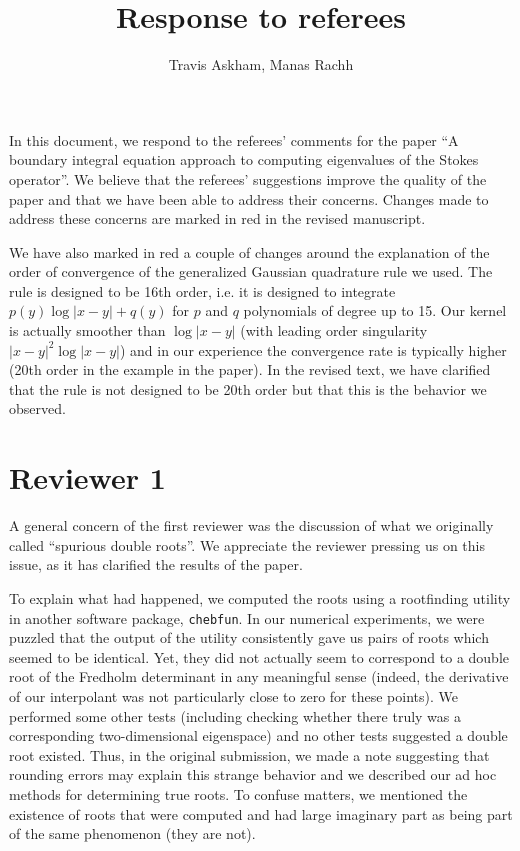 \documentclass{article}
\title{Response to referees}
\author{Travis Askham, Manas Rachh}
\begin{document}
\maketitle

In this document, we respond to the referees' comments
for the paper ``A boundary integral equation approach to computing
eigenvalues of the Stokes operator''.
We believe that the referees' suggestions improve the
quality of the paper and that we have been able to
address their concerns. Changes made to address these concerns
are marked in {\color{red} red} in the revised manuscript.

We have also marked in {\color{red} red} a couple of
changes around the explanation of the order of convergence
of the generalized Gaussian quadrature rule we used.
The rule is designed to be 16th order, i.e. it is designed
to integrate $p(y)\log|x-y| + q(y)$ for $p$ and
$q$ polynomials of degree up to 15. Our kernel is actually
smoother than $\log|x-y|$ (with leading order
singularity $|x-y|^2\log|x-y|$) and in our experience the
convergence rate is typically higher (20th order in
the example in the paper). In the revised text, we have clarified
that the rule is not designed to be 20th order but that this is
the behavior we observed. 


\section{Reviewer 1}

A general concern of the first reviewer was the discussion
of what we originally called ``spurious double roots''.
We appreciate the reviewer pressing us on this issue, as it
has clarified the results of the paper.

To explain what had happened, we computed the roots using a rootfinding
utility in another software package, \texttt{chebfun}. In our
numerical experiments, we were puzzled that the output of the
utility consistently gave us pairs of roots which seemed to
be identical. Yet, they did not actually seem to correspond to
a double root of the Fredholm determinant in any meaningful sense
(indeed, the derivative of our interpolant was not particularly
close to zero for these points). We performed some other tests
(including checking whether there truly was a corresponding
two-dimensional eigenspace) and no other tests suggested a double
root existed. Thus, in the original submission, we made a note
suggesting that rounding errors may explain this strange behavior
and we described our ad hoc methods for determining true roots.
To confuse matters, we mentioned the existence of roots that
were computed and had large imaginary part as being part of
the same phenomenon (they are not).
\end{document}
